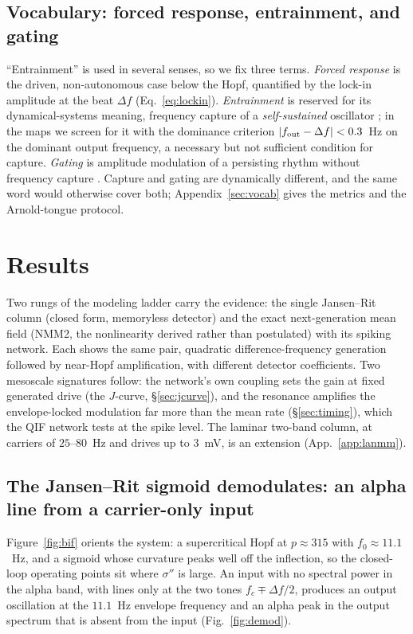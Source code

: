 \documentclass[11pt,a4paper]{article}
\newcommand{\Sig}{\sigma}
\begin{document}
\subsection{Vocabulary: forced response, entrainment, and gating}
``Entrainment'' is used in several senses, so we fix three terms. \emph{Forced response}
is the driven, non-autonomous case below the Hopf, quantified by the lock-in amplitude at
the beat $\Delta f$ (Eq.~\eqref{eq:lockin}). \emph{Entrainment} is reserved for its
dynamical-systems meaning, frequency capture of a \emph{self-sustained} oscillator
\cite{pikovsky2001}; in the maps we screen for it with the dominance criterion
$|f_{\rm out}-\Delta f|<0.3$~Hz on the dominant output frequency, a necessary but not
sufficient condition for capture. \emph{Gating} is amplitude modulation of a persisting rhythm without
frequency capture \cite{canolty2010,tort2010}. Capture and gating are dynamically different, and the same word would otherwise cover
both; Appendix~\ref{sec:vocab} gives the metrics and the Arnold-tongue protocol.

\section{Results}
Two rungs of the modeling ladder carry the evidence: the single Jansen--Rit column
(closed form, memoryless detector) and the exact next-generation mean field (NMM2, the
nonlinearity derived rather than postulated) with its spiking network. Each shows the same
pair, quadratic difference-frequency generation followed by near-Hopf amplification, with
different detector coefficients. Two mesoscale signatures follow: the network's own
coupling sets the gain at fixed generated drive (the $J$-curve, \S\ref{sec:jcurve}), and
the resonance amplifies the envelope-locked modulation far more than the mean rate
(\S\ref{sec:timing}), which the QIF network tests at the spike level. The laminar two-band
column, at carriers of $25$--$80$~Hz and drives up to $3$~mV, is an extension
(App.~\ref{app:lanmm}).

\subsection{The Jansen--Rit sigmoid demodulates: an alpha line from a carrier-only input}
Figure~\ref{fig:bif} orients the system: a supercritical Hopf at
$p\!\approx\!315$ with $f_0\!\approx\!11.1$~Hz, and a sigmoid whose curvature peaks
well off the inflection, so the closed-loop operating points sit where $\Sig''$ is
large. An input with no spectral power in the alpha band, with lines only at the two
tones $f_c\mp\Delta f/2$, produces an output oscillation at the $11.1$~Hz envelope
frequency and an alpha peak in the output spectrum that is absent from the input
(Fig.~\ref{fig:demod}).
\end{document}
